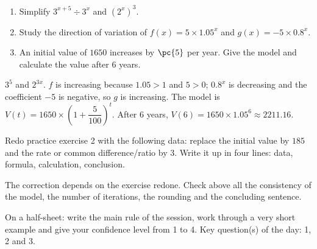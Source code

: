 \begin{exercise}[essential]
\begin{enumerate}\item Simplify $3^{x+5}\div3^x$ and $(2^x)^3$.\item Study the direction of variation of $f(x)=5\times\num{1,05}^x$ and $g(x)=-5\times\num{0,8}^x$.\item An initial value of $1650$ increases by $\pc{5}$ per year. Give the model and calculate the value after $6$ years.\end{enumerate}
\end{exercise}
\begin{solution}$3^5$ and $2^{3x}$. $f$ is increasing because $\num{1,05}>1$ and $5>0$; $\num{0,8}^x$ is decreasing and the coefficient $-5$ is negative, so $g$ is increasing. The model is $V(t)=1650\times\left(1+\dfrac{5}{100}\right)^t$. After $6$ years, $V(6)=1650\times\num{1,05}^6\approx\num{2211,16}$.\end{solution}


\begin{homework}Redo practice exercise 2 with the following data: replace the initial value by $185$ and the rate or common difference/ratio by $3$. Write it up in four lines: data, formula, calculation, conclusion.\end{homework}
\begin{solution}The correction depends on the exercise redone. Check above all the consistency of the model, the number of iterations, the rounding and the concluding sentence.\end{solution}

\begin{exitticket}[3 minutes]On a half-sheet: write the main rule of the session, work through a very short example and give your confidence level from 1 to 4. Key question(s) of the day: 1, 2 and 3.\end{exitticket}

